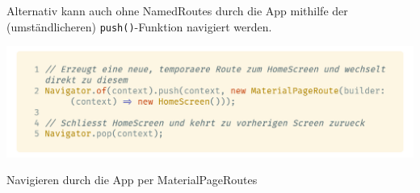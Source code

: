 Alternativ kann auch ohne NamedRoutes durch die App mithilfe der (umständlicheren) \lstinline{push()}-Funktion navigiert 
werden.

\begin{code}
    \centering
    \includegraphics[width=1\textwidth]{images/Flutter/flutterAlternateNavigator.png}
    \caption{Navigieren durch die App per MaterialPageRoutes}
\end{code}
